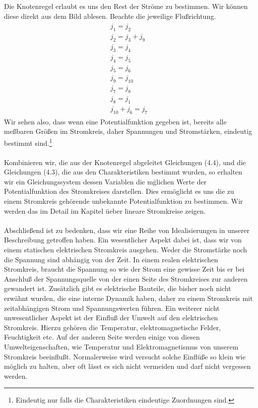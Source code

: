 \documentclass[11pt,a4paper,leqno]{report}
\numberwithin{equation}{chapter}
\begin{document}
Die Knotenregel erlaubt es uns den Rest der Str\"ome zu bestimmen. Wir k\"onnen diese direkt aus dem Bild ablesen. Beachte die jeweilige Flu\ss{}richtung.
\begin{align} 
\begin{split}
j_1 = j_2\\
j_2 = j_3 + j_9\\
j_3 = j_4\\
j_4 = j_5\\
j_5 = j_6\\
j_9 = j_{10}\\
j_7 = j_8\\
j_8 = j_1\\
j_{10} + j_6 = j_7
\end{split}
\end{align}
Wir sehen also, dass wenn eine Potentialfunktion gegeben ist, bereits alle me\ss{}baren Gr\"o\ss{}en im Stromkreis, daher Spannungen und Stromst\"arken, eindeutig bestimmt sind.\footnote{Eindeutig nur falls die Charakteristiken eindeutige Zuordnungen sind.}\\
\\
Kombinieren wir, die aus der Knotenregel abgeleitet Gleichungen (4.4), und die Gleichungen (4.3), die aus den Charakteristiken  bestimmt wurden, so erhalten wir ein Gleichungssystem dessen Variablen die m\"glichen Werte der Potentialfunktion des Stromkreises darstellen. Dies erm\"oglicht es uns die zu einem Stromkreis geh\"orende unbekannte Potentialfunktion zu bestimmen. Wir werden das im Detail im Kapitel \"ueber lineare Stromkreise zeigen.
\\
\\
Abschlie\ss{}end ist zu bedenken, dass wir eine Reihe von Idealisierungen in unserer Beschreibung getroffen haben. Ein wesentlicher Aspekt dabei ist, dass wir von einem statischen elektrischen Stromkreis ausgehen. Weder die Stromst\"arke noch die Spannung sind abh\"angig von der Zeit. In einem realen elektrischen Stromkreis, braucht die Spannung so wie der Strom eine gewisse Zeit bis er bei Anschlu\ss{} der Spannungsquelle von der einen Seite des Stromkreises zur anderen gewandert ist. Zus\"atzlich gibt es elektrische Bauteile, die bisher noch nicht erw\"ahnt wurden, die eine interne Dynamik haben, daher zu einem Stromkreis mit zeitabh\"angigen Strom und Spannungswerten f\"uhren.
Ein weiterer nicht unwesentlicher Aspekt ist der Einflu\ss{} der Umwelt auf den elektrischen Stromkreis. Hierzu geh\"oren die Temperatur, elektromagnetische Felder, Feuchtigkeit etc.
Auf der anderen Seite werden einige von diesen Umwelteigenschaften, wie Temperatur und Elektromagnetismus von unserem Stromkreis beeinflu\ss{}t. Normalerweise wird versucht solche Einfl\"u\ss{}e so klein wie m\"oglich zu halten, aber oft l\"asst es sich nicht vermeiden und darf nicht vergessen werden.
\end{document}
